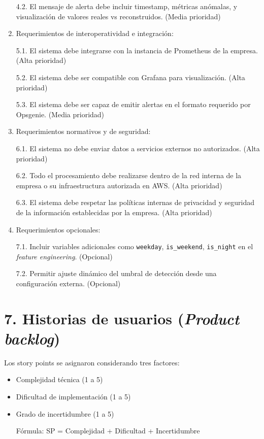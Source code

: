 \documentclass[
11pt, %
]{charter}
\begin{document}
\begin{enumerate}
 4.2. El mensaje de alerta debe incluir timestamp, métricas anómalas, y visualización de valores reales vs reconstruidos. (Media prioridad)
    \item Requerimientos de interoperatividad e integración:

 5.1. El sistema debe integrarse con la instancia de Prometheus de la empresa. (Alta prioridad)

 5.2. El sistema debe ser compatible con Grafana para visualización. (Alta prioridad)

 5.3. El sistema debe ser capaz de emitir alertas en el formato requerido por Opsgenie. (Media prioridad)
    \item Requerimientos normativos y de seguridad:

 6.1. El sistema no debe enviar datos a servicios externos no autorizados. (Alta prioridad)

 6.2. Todo el procesamiento debe realizarse dentro de la red interna de la empresa o su infraestructura autorizada en AWS. (Alta prioridad)

 6.3. El sistema debe respetar las políticas internas de privacidad y seguridad de la información establecidas por la empresa. (Alta prioridad)
    \item Requerimientos opcionales:

 7.1. Incluir variables adicionales como \verb|weekday|, \verb|is_weekend|, \verb|is_night| en el \textit{feature engineering}. (Opcional)

 7.2. Permitir ajuste dinámico del umbral de detección desde una configuración externa. (Opcional) 
\end{enumerate}
   
    
\section{7. Historias de usuarios (\textit{Product backlog})}
\label{sec:backlog}

Los story points se asignaron considerando tres factores:

\begin{itemize}
    \item Complejidad técnica (1 a 5)
    \item Dificultad de implementación (1 a 5)
    \item Grado de incertidumbre (1 a 5)

 Fórmula: SP = Complejidad + Dificultad + Incertidumbre
\end{itemize}
\end{document}
